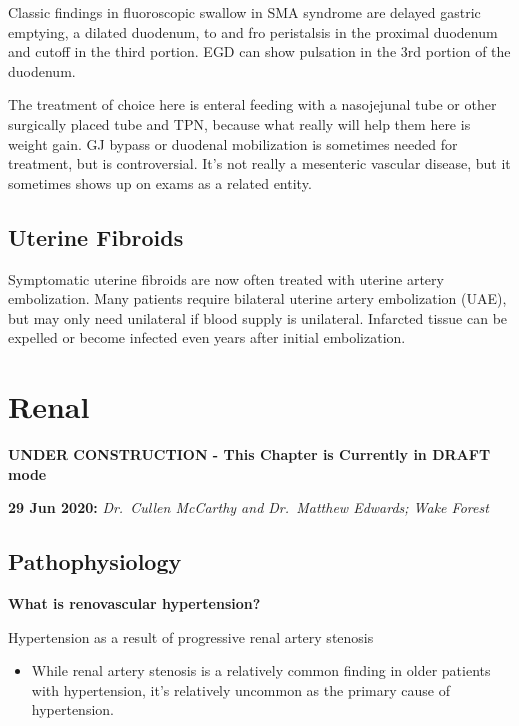 \documentclass[
]{book}
\providecommand{\tightlist}{%
  \setlength{\itemsep}{0pt}\setlength{\parskip}{0pt}}
\begin{document}
Classic findings in fluoroscopic swallow in SMA syndrome are delayed
gastric emptying, a dilated duodenum, to and fro peristalsis in the
proximal duodenum and cutoff in the third portion. EGD can show
pulsation in the 3rd portion of the
duodenum.\citep{warnckeSuperiorMesentericArtery2019}

The treatment of choice here is enteral feeding with a nasojejunal tube
or other surgically placed tube and TPN, because what really will help
them here is weight gain. GJ bypass or duodenal mobilization is
sometimes needed for treatment, but is controversial. It's not really a
mesenteric vascular disease, but it sometimes shows up on exams as a
related entity.\citep{welschRecallingSuperiorMesenteric2007, merrettSuperiorMesentericArtery2009}

\hypertarget{uterine-fibroids}{%
\section{Uterine Fibroids}\label{uterine-fibroids}}

Symptomatic uterine fibroids are now often treated with uterine artery
embolization. Many patients require bilateral uterine artery
embolization (UAE), but may only need unilateral if blood supply is
unilateral. Infarcted tissue can be expelled or become infected even
years after initial embolization.
\citep{stepniakUterineArteryEmbolization2018}

\hypertarget{renal}{%
\chapter{Renal}\label{renal}}

\textbf{UNDER CONSTRUCTION - This Chapter is Currently in DRAFT mode}

\textbf{29 Jun 2020:} \emph{Dr.~Cullen McCarthy and Dr.~Matthew Edwards; Wake
Forest}

\hypertarget{pathophysiology}{%
\section{Pathophysiology}\label{pathophysiology}}

\textbf{What is renovascular hypertension?}

Hypertension as a result of progressive renal artery stenosis

\begin{itemize}
\tightlist
\item
  While renal artery stenosis is a relatively common finding in older
  patients with hypertension, it's relatively uncommon as the primary
  cause of hypertension.
\end{itemize}
\end{document}
